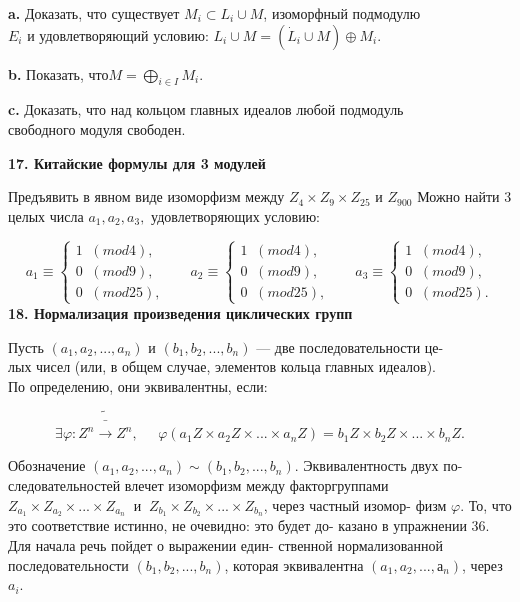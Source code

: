 {\bf a.} Доказать, что существует $M_i \subset L_i \cup M $, изоморфный подмодулю \\
$E_i$ и удовлетворяющий условию: $L_i \cup M = (\dot{L}_i \cup M)\oplus M_i$. 

\medskip

{\bf b.} Показать, что$M = \bigoplus_{i \in I}M_i$. 

\medskip

{\bf c.} Доказать, что над кольцом главных идеалов любой подмодуль \\
свободного модуля свободен. 

\medskip

{\noindent\bf 17. Китайские формулы для 3 модулей}

\medskip

Предъявить в явном виде изоморфизм между $ Z_4 \times Z_9 \times Z_25$ и $Z_{900}$ 
Можно найти 3 целых числа $a_1,a_2,a_3,$ удовлетворяющих условию: 

$$a_1 \equiv 
\begin{cases}
1\;\;(mod 4),  \\
0\;\;(mod 9),  \\
0\;\;(mod 25),  
\end{cases}
\;\;\;\;\;\;
a_2 \equiv 
\begin{cases}
1\;\;(mod 4),  \\
0\;\;(mod 9),  \\
0\;\;(mod 25),  
\end{cases}
\;\;\;\;\;\;
a_3 \equiv 
\begin{cases}
1\;\;(mod 4),  \\
0\;\;(mod 9),  \\
0\;\;(mod 25).  
\end{cases}
$$
\pagebreak
{\noindent\bf 18. Нормализация произведения циклических групп}

\medskip

Пусть $(a_1, a_2,..., a_n)$ и $(b_1, b_2,..., b_n)$ — две последовательности 
це-\\лых чисел (или, в общем случае, элементов кольца главных идеалов).\\ 
По определению, они эквивалентны, если:

$$\exists \varphi:Z^n\tilde{\bar{\rightarrow}} Z^n,\;\;\;\;\;\varphi(a_1Z\times a_2Z\times...\times a_nZ)=b_1Z\times b_2Z\times...\times b_nZ.$$

\noindent Обозначение $(a_1, a_2,..., a_n) \sim(b_1, b_2,..., b_n)$. Эквивалентность двух
по-\linebreak
следовательностей влечет изоморфизм между факторгруппами 
$ Z_{a_1}\times Z_{a_2}\times ...\times Z_{a_n}\;\;\text{и}\;\;Z_{b_1}\times Z_{b_2}\times ...\times Z_{b_n} $, через частный 
изомор-\linebreak
физм $\varphi$. То, что это соответствие истинно, не очевидно: это будет 
до-\linebreak
казано в упражнении 36. Для начала речь пойдет о выражении 
един-\linebreak
ственной нормализованной последовательности $(b_1, b_2,..., b_n)$, которая\linebreak
эквивалентна $(a_1, a_2,..., а_n)$, через $a_i$. 



